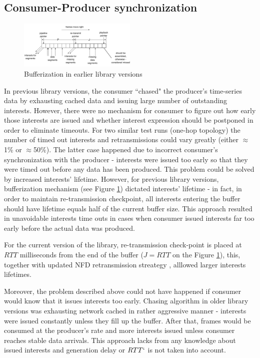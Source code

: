 \documentclass{icn/sig-alternate-2012} %
\begin{document}
\subsection{Consumer-Producer synchronization}

\begin{figure}[t!]
\centering
\includegraphics[width=0.5\textwidth]{buffer}
\caption{Bufferization in earlier library versions}
\label{fig:old-buf}
\end{figure}

In previous library versions, the consumer ``chased" the producer's time-series data by exhausting cached data and issuing large number of outstanding interests. However, there were no mechanism for consumer to figure out how early those interests are issued and whether interest expression should be postponed in order to eliminate timeouts. For two similar test runs (one-hop topology) the number of timed out interests and retransmissions could vary greatly (either $\approx$1\% or $\approx$50\%). The latter case happened due to incorrect consumer's synchronization with the producer - interests were issued too early so that they were timed out before any data has been produced. This problem could be solved by increased interests' lifetime. However, for previous library versions, bufferization mechanism (see Figure \ref{fig:old-buf}) dictated interests' lifetime - in fact, in order to maintain re-transmission checkpoint, all interests entering the buffer should have lifetime equals half of the current buffer size. This approach resulted in unavoidable interests time outs in cases when consumer issued interests far too early before the actual data was produced.

For the current version of the library, re-transmission check-point is placed at $RTT$ milliseconds from the end of the buffer ($J=RTT$ on the Figure \ref{fig:old-buf}), this, together with updated NFD retransmission streategy \cite{nfd-rtx}, alllowed larger interests lifetimes.

Moreover, the problem described above could not have happened if consumer would know that it issues interests too early. Chasing algorithm in older library versions was exhausting network cached in rather aggressive manner - interests were issued constantly unless they fill up the buffer. After that, frames would be consumed at the producer's rate and more interests issued unless consumer reaches stable data arrivals. This approach lacks from any knowledge about issued interests and generation delay or $RTT`$ is not taken into account.
\end{document}
